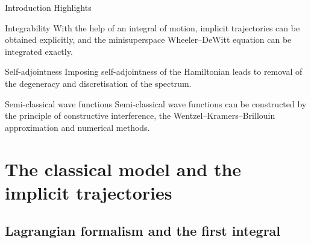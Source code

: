 \documentclass[8pt]{beamer}
\begin{document}
\begin{frame}%
{Introduction}%
{Highlights}
\begin{block}{Integrability}
With the help of an integral of motion, implicit trajectories can be obtained 
explicitly, and the minisuperspace Wheeler--DeWitt equation can be integrated 
exactly.
\end{block}

\begin{block}{Self-adjointness}
Imposing self-adjointness of the Hamiltonian leads to removal of the degeneracy 
and discretisation of the spectrum.
\end{block}

\begin{block}{Semi-classical wave functions}
Semi-classical wave functions can be constructed by the principle of
constructive interference, the Wentzel--Kramers--Brillouin approximation and
numerical methods.
\end{block}

\end{frame}

\section{The classical model and the implicit trajectories}

\subsection{Lagrangian formalism and the first integral}
\end{document}
